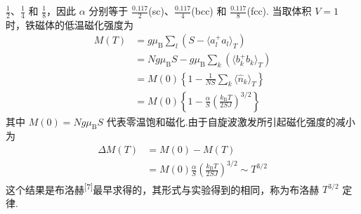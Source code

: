 $\frac{1}{2}$、$\frac{1}{4}$ 和 $\frac{1}{8}$，因此 $\alpha$ 分别等于
$\frac{0.117}{2}$(sc)、$\frac{0.117}{4}$(bcc) 和 $\frac{0.117}{8}$(fcc).
当取体积 $V=1$ 时，铁磁体的低温磁化强度为
\begin{equation}
\begin{aligned}
  M\left(T\right)&=g\mu_{\mathrm{B}}\sum_l\left(S-\langle a_l^{+}a_l\rangle_T\right)\\
  &=Ng\mu_{\mathrm{B}}S-g\mu_{\mathrm{B}}\sum_k\left(\langle b_k^{+}b_k\rangle_T\right)\\
  &=M\left(0\right)\left\{1-\frac{1}{NS}\sum_k\langle\hat{n}_k\rangle_T\right\}\\
  &=M\left(0\right)\left\{1-\frac{\alpha}{S}\left(\frac{k_{\mathrm{B}}T}{2SJ}\right)^{3/2}\right\}
\end{aligned}
\end{equation}
其中 $M\left(0\right)=Ng\mu_{\mathrm{B}}S$
代表零温饱和磁化.由于自旋波激发所引起磁化强度的减小为
\begin{equation}
\begin{aligned}
  \Delta M\left(T\right)&=M\left(0\right)-M\left(T\right)\\
  &=M\left(0\right)\frac{\alpha}{S}\left(\frac{k_{\mathrm{B}}T}{2SJ}\right)^{3/2}\sim T^{3/2}
\end{aligned}
\end{equation}
这个结果是布洛赫\textsuperscript{[7]}最早求得的，其形式与实验得到的相同，称为布洛赫 $T^{3/2}$ 定律.

